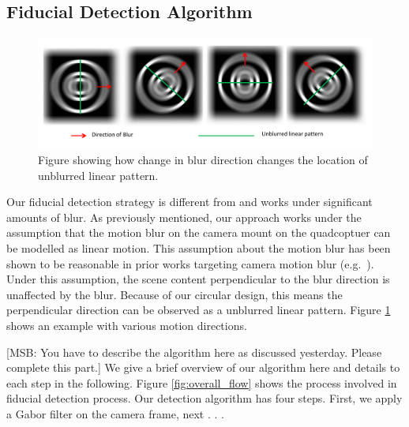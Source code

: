\documentclass[runningheads]{llncs}
\begin{document}
\subsection{Fiducial Detection Algorithm}

\begin{figure}
\centering
\includegraphics[width=\linewidth]{blur_direction.pdf}
\caption{Figure showing how change in blur direction changes the location of
unblurred linear pattern.}
\label{fig:blur_direction}
\end{figure}

Our fiducial detection strategy is different from \cite{NaimarkF02,Pitag13} and works
under significant amounts of blur.   As previously mentioned, our approach works
 under the assumption that the motion blur on the camera mount on the quadcoptuer
 can be modelled as linear motion.  This assumption about the motion blur has been shown to be
 reasonable in prior works targeting camera motion blur (e.g.~\cite{Moshe:2003,Moshe:2004}).
Under this assumption, the scene content perpendicular to the blur direction is
unaffected by the blur.  Because of our circular design, this means the
perpendicular direction can be observed as a unblurred linear pattern.  Figure
\ref{fig:blur_direction} shows an example with various motion directions.

[MSB: You have to describe the algorithm here as discussed yesterday.  Please complete this
part.]
 We give a brief overview of our algorithm here and details to each step in the following. Figure \ref{fig:overall_flow} shows the process involved in fiducial detection
process. Our detection algorithm has four steps.  First, we apply a Gabor filter on the camera frame, next . . . 
\end{document}

